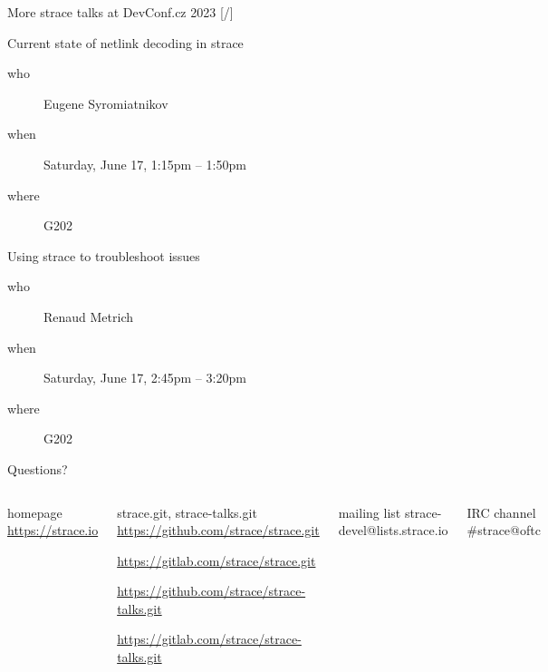 \documentclass[unicode,aspectratio=169,xcolor={table,dvipsnames,usernames}]{beamer}
\begin{document}
\begin{frame}{More strace talks at DevConf.cz 2023 \hfill [\insertframenumber/\inserttotalframenumber]}
\Large
\begin{block}{Current state of netlink decoding in strace}
\begin{description}
	\item[who] Eugene Syromiatnikov
	\item[when] Saturday, June 17, 1:15pm -- 1:50pm
	\item[where] G202
\end{description}
\end{block}

\begin{block}{Using strace to troubleshoot issues}
\begin{description}
	\item[who] Renaud Metrich
	\item[when] Saturday, June 17, 2:45pm -- 3:20pm
	\item[where] G202
\end{description}
\end{block}
\end{frame}

{
\begin{frame}[noframenumbering]{Questions?}
	\begin{columns}
		\column{9cm}
\begin{block}{\large homepage}
	\url{https://strace.io}
\end{block}
\begin{block}{\large strace.git, strace-talks.git}
	\url{https://github.com/strace/strace.git}

	\url{https://gitlab.com/strace/strace.git}

\smallskip

	\url{https://github.com/strace/strace-talks.git}

	\url{https://gitlab.com/strace/strace-talks.git}
\end{block}
\begin{block}{\large mailing list}
	strace-devel@lists.strace.io
\end{block}
\begin{block}{\large IRC channel}
	\#strace@oftc
\end{block}
		\column{3cm}
			\centerline{}
	\end{columns}
\end{frame}
}
\end{document}

